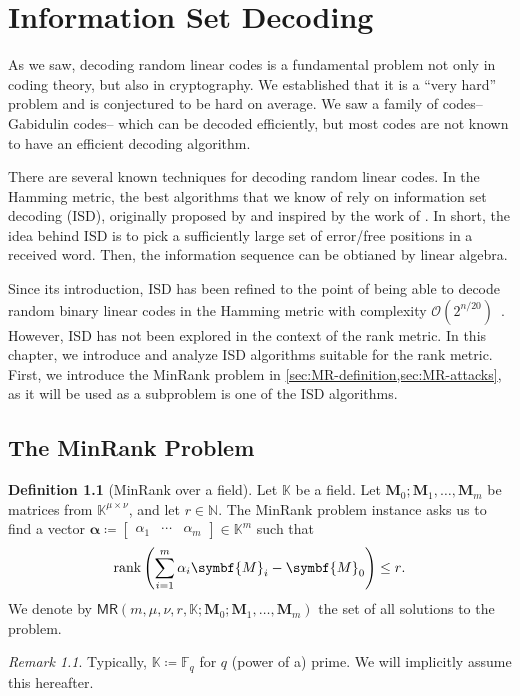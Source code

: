 \documentclass[version=last, paper=A4, parskip=half, oneside,%
toc=bibliography, toc=listof, listof=leveldown]{scrbook}
\theoremstyle{plain}
\theoremstyle{definition}
\newtheorem{definition}{Definition}
\theoremstyle{remark}
\newtheorem*{remark}{Remark}
\renewcommand*{\vec}{\symbf}
\newcommand*{\mat}{\symbf}
\DeclareMathOperator{\rank}{rank}
\newcommand*{\KK}{\ensuremath{\mathbb{K}}}
\newcommand*{\FF}{\ensuremath{\mathbb{F}}}
\newcommand*{\NN}{\ensuremath{\mathbb{N}}}
\newcommand*{\MR}{\ensuremath{\mathsf{MR}}}
\begin{document}
\chapter{Information Set Decoding}\label{chap:ISD}

As we saw, decoding random linear codes is a fundamental problem not only in
coding theory, but also in cryptography.  We established that it is a
\enquote{very hard} problem and is conjectured to be hard on average.  We saw a
family of codes\--- Gabidulin codes\--- which can be decoded efficiently, but
most codes are not known to have an efficient decoding algorithm.

There are several known techniques for decoding random linear codes.  In the
Hamming metric, the best algorithms that we know of rely on information set
decoding (ISD), originally proposed by \textcite{Eli78} and inspired by the work
of \textcite{Pra62}.  In short, the idea behind ISD is to pick a sufficiently
large set of error\-/free positions in a received word.  Then, the information
sequence can be obtianed by linear algebra.

Since its introduction, ISD has been refined to the point of being able to
decode random binary linear codes in the Hamming metric with complexity
\(\mathcal{O}(2^{n / {20}})\)~\cite{B+12}.  However, ISD has not been explored
in the context of the rank metric.  In this chapter, we introduce and analyze
ISD algorithms suitable for the rank metric.  First, we introduce the MinRank
problem in \cref{sec:MR-definition,sec:MR-attacks}, as it will be used as a
subproblem is one of the ISD algorithms.

\section{The MinRank Problem}\label{sec:MR-definition}

\begin{definition}[MinRank over a field]\label{def:MR}
  Let \(\KK\) be a field.  Let \(\mat{M}_0; \mat{M}_1, \ldots, \mat{M}_m\) be
  matrices from \(\KK^{\mu \times \nu}\), and let \(r \in \NN\).  The MinRank
  problem instance asks us to find a vector
  \(\vec{\alpha} \coloneqq \begin{bmatrix} \alpha_1 & \cdots &
    \alpha_m \end{bmatrix} \in \KK^m\) such that
  \[
    \rank\left(\sum_{i = 1}^{m} \alpha_i \mat{M}_i - \mat{M}_0\right) \le r\text.
  \]
  We denote by
  \(\MR(m, \mu, \nu, r, \KK; \mat{M}_0; \mat{M}_1, \ldots, \mat{M}_m)\) the set
  of all solutions to the problem.
  \begin{remark}
    Typically, \(\KK \coloneqq \FF_q\) for \(q\) (power of a) prime.  We will
    implicitly assume this hereafter.
  \end{remark}
\end{definition}
\end{document}
